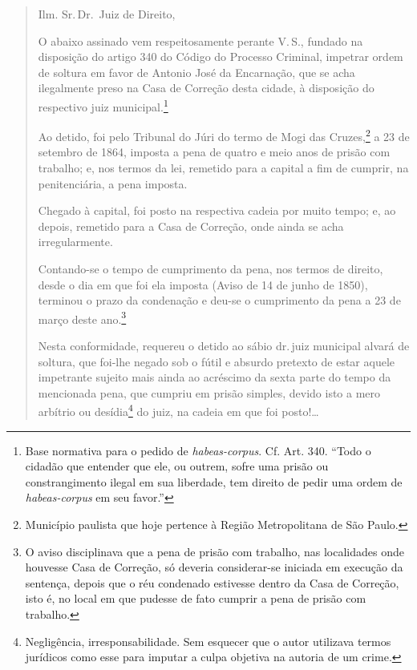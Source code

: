 \begin{quote}
Ilm. Sr.\,Dr.~Juiz de Direito,

O abaixo assinado vem respeitosamente perante V.\,S., fundado na
disposição do artigo 340 do Código do Processo Criminal, impetrar ordem
de soltura em favor de Antonio José da Encarnação, que se acha
ilegalmente preso na Casa de Correção desta cidade, à disposição do
respectivo juiz municipal.\footnote{Base normativa para o pedido de
  \emph{habeas-corpus}. Cf. Art. 340. ``Todo o cidadão que entender que
  ele, ou outrem, sofre uma prisão ou constrangimento ilegal em sua
  liberdade, tem direito de pedir uma ordem de \emph{habeas-corpus} em
  seu favor.''}

Ao detido, foi pelo Tribunal do Júri do termo de Mogi das
Cruzes,\footnote{Município paulista que hoje pertence à Região
  Metropolitana de São Paulo.} a 23 de setembro de 1864, imposta a pena
de quatro e meio anos de prisão com trabalho; e, nos termos da lei,
remetido para a capital a fim de cumprir, na penitenciária, a pena
imposta.

Chegado à capital, foi posto na respectiva cadeia por muito tempo; e, ao
depois, remetido para a Casa de Correção, onde ainda se acha
irregularmente.

Contando-se o tempo de cumprimento da pena, nos termos de direito, desde
o dia em que foi ela imposta (Aviso de 14 de junho de 1850), terminou o
prazo da condenação e deu-se o cumprimento da pena a 23 de março deste
ano.\footnote{O aviso disciplinava que a pena de prisão com trabalho,
  nas localidades onde houvesse Casa de Correção, só deveria
  considerar-se iniciada em execução da sentença, depois que o réu
  condenado estivesse dentro da Casa de Correção, isto é, no local em
  que pudesse de fato cumprir a pena de prisão com trabalho.}

Nesta conformidade, requereu o detido ao sábio dr.\,juiz municipal alvará
de soltura, que foi-lhe negado sob o fútil e absurdo pretexto de estar
aquele impetrante sujeito mais ainda ao acréscimo da sexta parte do
tempo da mencionada pena, que cumpriu em prisão simples, devido isto a
mero arbítrio ou desídia\footnote{Negligência, irresponsabilidade. Sem
  esquecer que o autor utilizava termos jurídicos como esse para imputar
  a culpa objetiva na autoria de um crime.} do juiz, na cadeia em que
foi posto!\ldots{}


\end{quote}
